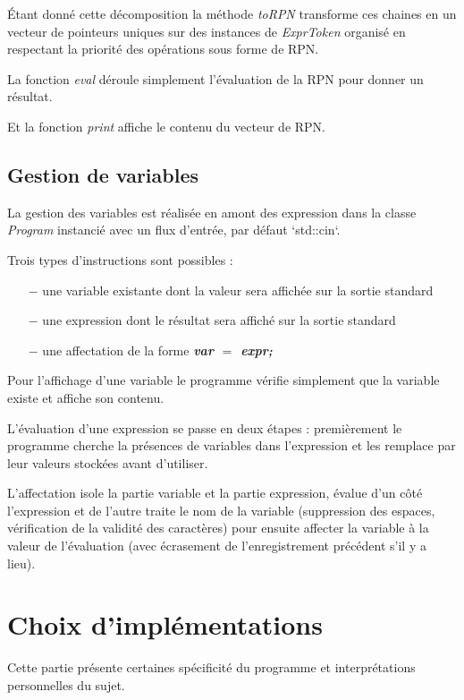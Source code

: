 \documentclass[]{article}
\begin{document}
\'Etant donné cette décomposition la méthode \textit{toRPN} transforme ces chaines en un vecteur de pointeurs uniques sur des instances de \textit{ExprToken} organisé en respectant la priorité des opérations sous forme de RPN.

La fonction \textit{eval} déroule simplement l'évaluation de la RPN pour donner un résultat.

Et la fonction \textit{print} affiche le contenu du vecteur de RPN.
\vspace{2cm}

\subsection{Gestion de variables}
La gestion des variables est réalisée en amont des expression dans la classe \textit{Program} instancié avec un flux d'entrée, par défaut `std::cin`.

Trois types d'instructions sont possibles :
\begin{itemize}
\item[\hspace{.5cm}$-$]une variable existante dont la valeur sera affichée sur la sortie standard
\item[\hspace{.5cm}$-$]une expression dont le résultat sera affiché sur la sortie standard
\item[\hspace{.5cm}$-$]une affectation de la forme \textbf{\textit{var $=$ expr;}} 
\end{itemize}\bigskip

Pour l'affichage d'une variable le programme vérifie simplement que la variable existe et affiche son contenu.

L'évaluation d'une expression se passe en deux étapes : premièrement le programme cherche la présences de variables dans l'expression et les remplace par leur valeurs stockées avant d'utiliser.

L'affectation isole la partie variable et la partie expression, évalue d'un côté l'expression et de l'autre traite le nom de la variable (suppression des espaces, vérification de la validité des caractères) pour ensuite affecter la variable à la valeur de l'évaluation (avec écrasement de l'enregistrement précédent s'il y a lieu).


\section{Choix d'implémentations}
Cette partie présente certaines spécificité du programme et interprétations personnelles du sujet.
\end{document}
